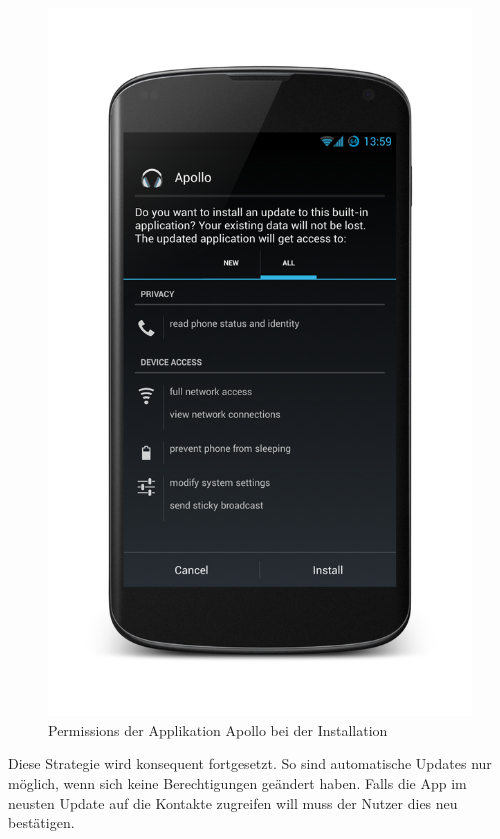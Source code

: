 \begin{figure}[ht!]
\begin{center}
\includegraphics[scale=0.2]{images/permissions}
\caption{Permissions der Applikation Apollo bei der Installation}
\label{permissions}
\end{center}
\end{figure}

Diese Strategie wird konsequent fortgesetzt. So sind automatische Updates nur möglich, wenn sich keine Berechtigungen geändert haben. Falls die App im neusten Update auf die Kontakte zugreifen will muss der Nutzer dies neu bestätigen.

